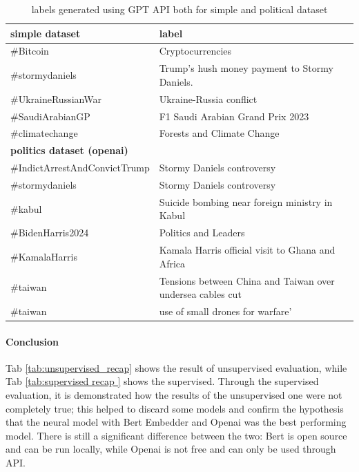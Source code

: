 \begin{table}
\begin{tabular}{ll}
\hline
\textbf{simple dataset}            & \textbf{label}                                             \\ \hline
\#Bitcoin                          & Cryptocurrencies                                            \\
\#stormydaniels                    & Trump's hush money payment to Stormy Daniels.              \\
\#UkraineRussianWar                & Ukraine-Russia conflict                                    \\
\#SaudiArabianGP                   & F1 Saudi Arabian Grand Prix 2023                           \\
\#climatechange                    & Forests and Climate Change                                 \\ \hline
\textbf{politics dataset (openai)} &                                                            \\ \hline
\#IndictArrestAndConvictTrump      & Stormy Daniels controversy                                 \\
\#stormydaniels                    & Stormy Daniels controversy                                 \\
\#kabul                            & Suicide bombing near foreign ministry in Kabul             \\
\#BidenHarris2024                  & Politics and Leaders                                       \\
\#KamalaHarris                     & Kamala Harris official visit to Ghana and Africa           \\
\#taiwan                           & Tensions between China and Taiwan over undersea cables cut \\
\#taiwan                           & use of small drones for warfare'                           \\ \hline
\end{tabular}
\caption{labels generated using GPT API both for simple and political dataset
}
\label{tab:supervised_labels}
\end{table}

\paragraph{Conclusion}
Tab \ref{tab:unsupervised_recap} shows the result of unsupervised evaluation, while Tab \ref{tab:supervised recap } shows the supervised. Through the supervised evaluation, it is demonstrated  how the results of the unsupervised one were not completely true; this helped to discard some models and confirm the hypothesis that the neural model with Bert Embedder and Openai was the best performing model. There is still a significant difference between the two: Bert is open source and can be run locally, while Openai is not free and can only be used through API.



